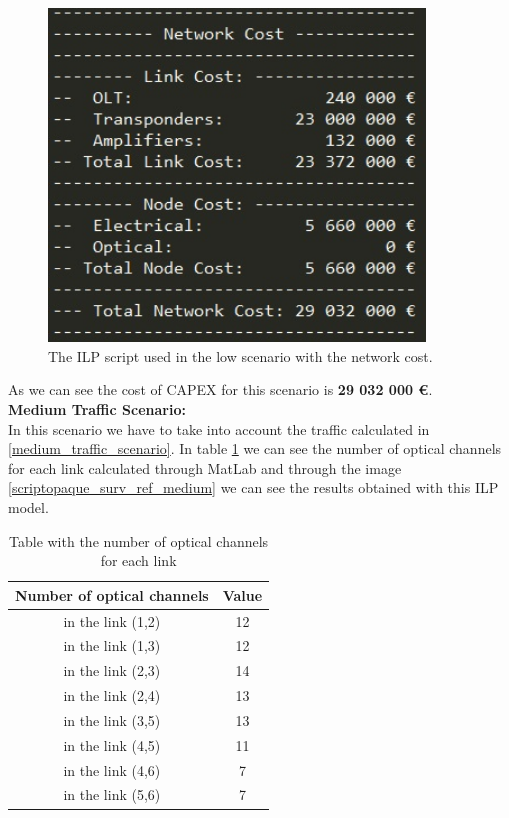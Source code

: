 \begin{figure}[h!]
\centering
\includegraphics[width=10cm]{sdf/ilp/figures/script_opaque_protec_ref_low}
\caption{The ILP script used in the low scenario with the network cost.}
\label{scriptopaque_surv_ref_low}
\end{figure}

As we can see the cost of CAPEX for this scenario is \textbf{29 032 000 \euro}.\\


\textbf{Medium Traffic Scenario:}\\

In this scenario we have to take into account the traffic calculated in \ref{medium_traffic_scenario}. In table \ref{result_ILP2P_reference} we can see the number of optical channels for each link calculated through MatLab and through the image \ref{scriptopaque_surv_ref_medium} we can see the results obtained with this ILP model.\\

\begin{table}[h!]
\centering
\begin{tabular}{|| c | c||}
 \hline
 Number of optical channels & Value \\
 \hline\hline
 in the link (1,2) & 12 \\
 in the link (1,3) & 12 \\
 in the link (2,3) & 14 \\
 in the link (2,4) & 13 \\
 in the link (3,5) & 13 \\
 in the link (4,5) & 11 \\
 in the link (4,6) & 7 \\
 in the link (5,6) & 7 \\
 \hline
\end{tabular}
\caption{Table with the number of optical channels for each link}
\label{result_ILP2P_reference}
\end{table}
\newpage


